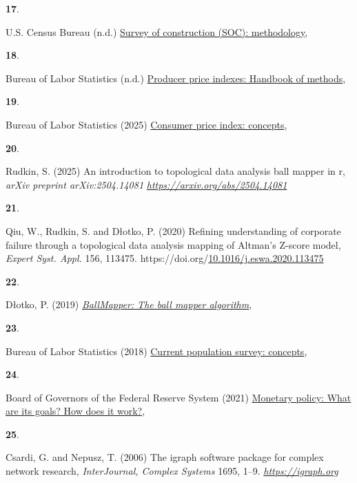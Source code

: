 \documentclass[10pt, letterpaper]{article}
\newlength{\cslhangindent}
\newlength{\csllabelwidth}
\newenvironment{CSLReferences}[2]
  {\begin{list}{}{%
    \setlength{\itemindent}{0pt}
    \setlength{\leftmargin}{0pt}
    \setlength{\parsep}{0pt}
    \ifodd #1
      \setlength{\leftmargin}{\cslhangindent}
      \setlength{\itemindent}{-1\cslhangindent}
    \fi
    \setlength{\itemsep}{#2\baselineskip}}}
  {\end{list}}
\newcommand{\CSLLeftMargin}[1]{\parbox[t]{\csllabelwidth}{\strut#1\strut}}
\newcommand{\CSLRightInline}[1]{\parbox[t]{\linewidth - \csllabelwidth}{\strut#1\strut}}
\begin{document}
\begin{CSLReferences}{1}{0}
\CSLLeftMargin{\textbf{17}. }%
\CSLRightInline{U.S. Census Bureau (n.d.)
\href{https://www.census.gov/construction/soc/methodology.html}{Survey
of construction (SOC): methodology}, }

\CSLLeftMargin{\textbf{18}. }%
\CSLRightInline{Bureau of Labor Statistics (n.d.)
\href{https://www.bls.gov/opub/hom/ppi/home.htm}{Producer price indexes:
Handbook of methods}, }

\CSLLeftMargin{\textbf{19}. }%
\CSLRightInline{Bureau of Labor Statistics (2025)
\href{https://www.bls.gov/opub/hom/cpi/concepts.htm}{Consumer price
index: concepts}, }

\CSLLeftMargin{\textbf{20}. }%
\CSLRightInline{Rudkin, S. (2025) An introduction to topological data
analysis ball mapper in r, \emph{arXiv preprint arXiv:2504.14081}
\emph{\url{https://arxiv.org/abs/2504.14081}}}

\CSLLeftMargin{\textbf{21}. }%
\CSLRightInline{Qiu, W., Rudkin, S. and Dłotko, P. (2020) Refining
understanding of corporate failure through a topological data analysis
mapping of {A}ltman's {Z}-score model, \emph{Expert Syst. Appl.} 156,
113475.
https://doi.org/\href{https://doi.org/10.1016/j.eswa.2020.113475}{10.1016/j.eswa.2020.113475}}

\CSLLeftMargin{\textbf{22}. }%
\CSLRightInline{Dłotko, P. (2019)
\emph{\href{https://CRAN.R-project.org/package=BallMapper}{BallMapper:
The ball mapper algorithm}}, }

\CSLLeftMargin{\textbf{23}. }%
\CSLRightInline{Bureau of Labor Statistics (2018)
\href{https://www.bls.gov/opub/hom/cps/concepts.htm}{Current population
survey: concepts}, }

\CSLLeftMargin{\textbf{24}. }%
\CSLRightInline{Board of Governors of the Federal Reserve System (2021)
\href{https://www.federalreserve.gov/monetarypolicy/monetary-policy-what-are-its-goals-how-does-it-work.htm}{Monetary
policy: What are its goals? How does it work?}, }

\CSLLeftMargin{\textbf{25}. }%
\CSLRightInline{Csardi, G. and Nepusz, T. (2006) The igraph software
package for complex network research, \emph{InterJournal, Complex
Systems} 1695, 1--9. \emph{\url{https://igraph.org}}}


\end{CSLReferences}
\end{document}
